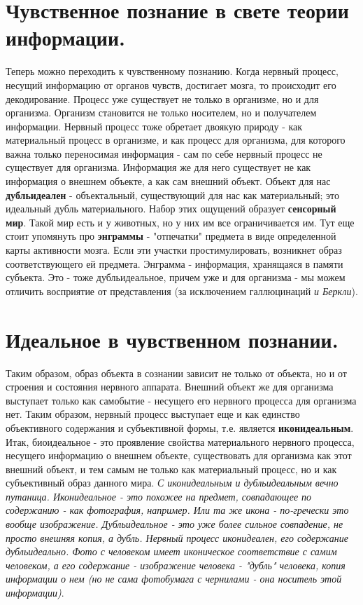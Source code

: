 \section{ Чувственное познание в свете теории информации.}
Теперь можно переходить к чувственному познанию. Когда нервный процесс, несущий информацию от органов чувств, достигает мозга, то происходит его декодирование. Процесс уже существует не только в организме, но и для организма. Организм становится не только носителем, но и получателем информации. Нервный процесс тоже обретает двоякую природу - как материальный процесс в организме, и как процесс для организма, для которого важна только переносимая информация - сам по себе нервный процесс не существует для организма. Информация же для него существует не как информация о внешнем объекте, а как сам внешний объект. Объект для нас \textbf{дубльидеален} - объектальный, существующий для нас как материальный; это идеальный дубль материального. Набор этих ощущений образует \textbf{сенсорный мир}. Такой мир есть и у животных, но у них им все ограничивается им. Тут еще стоит упомянуть про \textbf{энграммы} - "отпечатки" предмета в виде определенной карты активности мозга. Если эти участки простимулировать, возникнет образ соответствующего ей предмета. Энграмма - информация, хранящаяся в памяти субъекта. Это - тоже дубльидеальное, причем уже и для организма - мы можем отличить восприятие от представления (за исключением галлюцинаций \textit{и Беркли}).

\section{ Идеальное в чувственном познании.}
Таким образом, образ объекта в сознании зависит не только от объекта, но и от строения и состояния нервного аппарата. Внешний объект же для организма выступает только как самобытие - несущего его нервного процесса для организма нет. Таким образом, нервный процесс выступает еще и как единство объективного содержания и субъективной формы, т.е. является \textbf{иконидеальным}. Итак, биоидеальное - это проявление свойства материального нервного процесса, несущего информацию о  внешнем объекте, существовать для организма как этот внешний объект, и тем самым не только как материальный процесс, но и как субъективный образ данного мира. \textit{С иконидеальным и дубльидеальным вечно путаница. Иконидеальное - это похожее на предмет, совпадающее по содержанию - как фотография, например. Или та  же икона - по-гречески это вообще изображение. Дубльидеальное - это уже более сильное совпадение, не просто внешняя копия, а дубль. Нервный процесс иконидеален, его содержание дубльидеально. Фото с человеком имеет иконическое соответствие с самим человеком, а его содержание - изображение человека - "дубль" человека, копия информации о нем (но не сама фотобумага с чернилами - она носитель этой информации)}.

